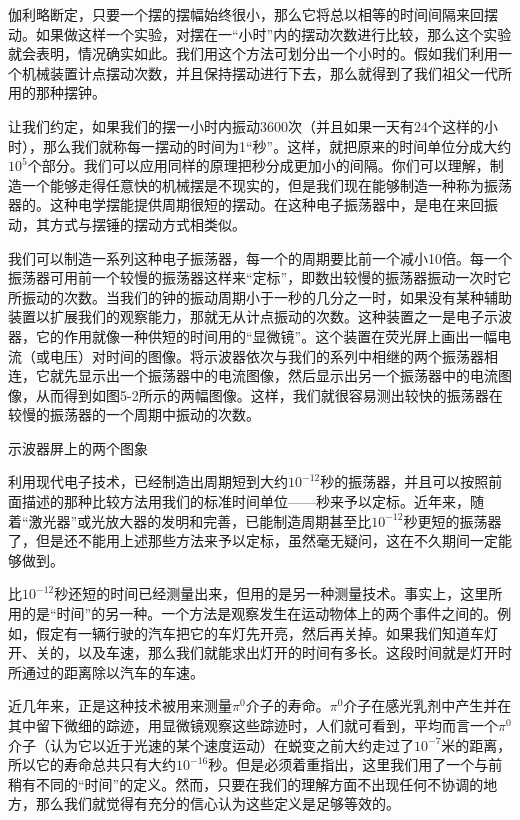 \documentclass[12pt,oneside]{book}
\begin{document}
\begin{common-format}
伽利略断定，只要一个摆的摆幅始终很小，那么它将总以相等的时间间隔来回摆动。如果做这样一个实验，对摆在一“小时”内的摆动次数进行比较，那么这个实验就会表明，情况确实如此。我们用这个方法可划分出一个小时的。假如我们利用一个机械装置计点摆动次数，并且保持摆动进行下去，那么就得到了我们祖父一代所用的那种摆钟。

让我们约定，如果我们的摆一小时内振动3600次（并且如果一天有24个这样的小时），那么我们就称每一摆动的时间为1“秒”。这样，就把原来的时间单位分成大约$ 10^5 $个部分。我们可以应用同样的原理把秒分成更加小的间隔。你们可以理解，制造一个能够走得任意快的机械摆是不现实的，但是我们现在能够制造一种称为振荡器的。这种电学摆能提供周期很短的摆动。在这种电子振荡器中，是电在来回振动，其方式与摆锤的摆动方式相类似。

我们可以制造一系列这种电子振荡器，每一个的周期要比前一个减小10倍。每一个振荡器可用前一个较慢的振荡器这样来“定标”，即数出较慢的振荡器振动一次时它所振动的次数。当我们的钟的振动周期小于一秒的几分之一时，如果没有某种辅助装置以扩展我们的观察能力，那就无从计点振动的次数。这种装置之一是电子示波器，它的作用就像一种供短的时间用的“显微镜”。这个装置在荧光屏上画出一幅电流（或电压）对时间的图像。将示波器依次与我们的系列中相继的两个振荡器相连，它就先显示出一个振荡器中的电流图像，然后显示出另一个振荡器中的电流图像，从而得到如图5-2所示的两幅图像。这样，我们就很容易测出较快的振荡器在较慢的振荡器的一个周期中振动的次数。
\begin{fig}[3]{示波器屏上的两个图象}
\caption{\footnotesize 示波器屏上的两个图象。在(a)中，示波器与一个振荡器相连接；在(b)中，它与另一个其周期只有前者十分之一的振荡器相连接。}
\label{fig:示波器屏上的两个图象}
\end{fig}


利用现代电子技术，已经制造出周期短到大约$ 10^{-12} $秒的振荡器，并且可以按照前面描述的那种比较方法用我们的标准时间单位——秒来予以定标。近年来，随着“激光器”或光放大器的发明和完善，已能制造周期甚至比$ 10^{-12} $秒更短的振荡器了，但是还不能用上述那些方法来予以定标，虽然毫无疑问，这在不久期间一定能够做到。

比$ 10^{-12} $秒还短的时间已经测量出来，但用的是另一种测量技术。事实上，这里所用的是“时间”的另一种。一个方法是观察发生在运动物体上的两个事件之间的。例如，假定有一辆行驶的汽车把它的车灯先开亮，然后再关掉。如果我们知道车灯开、关的，以及车速，那么我们就能求出灯开的时间有多长。这段时间就是灯开时所通过的距离除以汽车的车速。

近几年来，正是这种技术被用来测量$\pi^0$介子的寿命。$\pi^0$介子在感光乳剂中产生并在其中留下微细的踪迹，用显微镜观察这些踪迹时，人们就可看到，平均而言一个$\pi^0$介子（认为它以近于光速的某个速度运动）在蜕变之前大约走过了$ 10^{-7} $米的距离，所以它的寿命总共只有大约$ 10^{-16} $秒。但是必须着重指出，这里我们用了一个与前稍有不同的“时间”的定义。然而，只要在我们的理解方面不出现任何不协调的地方，那么我们就觉得有充分的信心认为这些定义是足够等效的。


\end{common-format}
\end{document}
